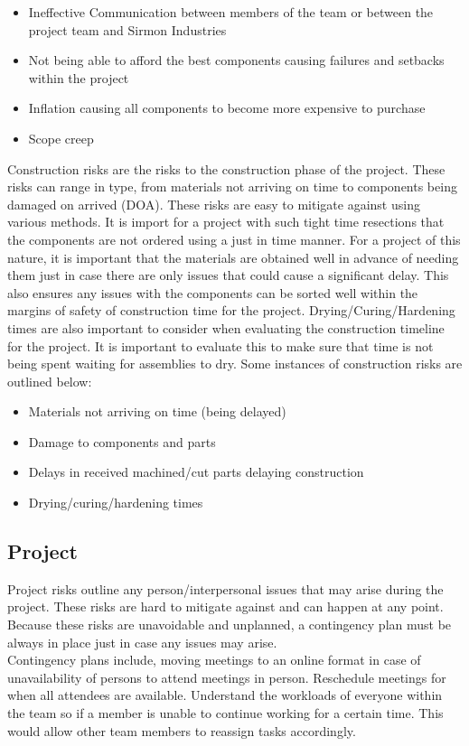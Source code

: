 \documentclass [12pt]{article}
\begin{document}
\begin{itemize}
    \item Ineffective Communication between members of the team or between the project team and Sirmon Industries
    \item Not being able to afford the best components causing failures and setbacks within the project
    \item Inflation causing all components to become more expensive to purchase
    \item Scope creep
\end{itemize}

Construction risks are the risks to the construction phase of the project. These risks can range in type, from materials not arriving on time to components being damaged on arrived (DOA). These risks are easy to mitigate against using various methods. It is import for a project with such tight time resections that the components are not ordered using a just in time \cite{Just-In-Time_Manufacturing} manner. For a project of this nature, it is important that the materials are obtained well in advance of needing them just in case there are only issues that could cause a significant delay. This also ensures any issues with the components can be sorted well within the margins of safety of construction time for the project.
Drying/Curing/Hardening times are also important to consider when evaluating the construction timeline for the project. It is important to evaluate this to make sure that time is not being spent waiting for assemblies to dry.
Some instances of construction risks are outlined below:

\begin{itemize}
    \item Materials not arriving on time (being delayed)
    \item Damage to components and parts
    \item Delays in received machined/cut parts delaying construction
    \item Drying/curing/hardening times
\end{itemize}

\subsection{Project}\label{sec:Projcet_Risk}

Project risks outline any person/interpersonal issues that may arise during the project. These risks are hard to mitigate against and can happen at any point. Because these risks are unavoidable and unplanned, a contingency plan must be always in place just in case any issues may arise.
\\
Contingency plans include, moving meetings to an online format in case of unavailability of persons to attend meetings in person. Reschedule meetings for when all attendees are available. Understand the workloads of everyone within the team so if a member is unable to continue working for a certain time. This would allow other team members to reassign tasks accordingly.
\end{document}
